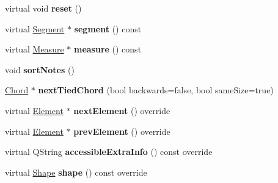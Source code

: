\begin{DoxyCompactItemize}
virtual void {\bfseries reset} ()
\item 
\mbox{\label{class_ms_1_1_chord_a6fc7f6c2b4efc0d38527023089169fac}} 
virtual \hyperlink{class_ms_1_1_segment}{Segment} $\ast$ {\bfseries segment} () const
\item 
\mbox{\label{class_ms_1_1_chord_a0f7ea26684e3b8de00cabbc489d1fa6b}} 
virtual \hyperlink{class_ms_1_1_measure}{Measure} $\ast$ {\bfseries measure} () const
\item 
\mbox{\label{class_ms_1_1_chord_a20163c8fc284ff06c00570f4fd26fb7a}} 
void {\bfseries sort\+Notes} ()
\item 
\mbox{\label{class_ms_1_1_chord_ab446d5ec17c723bb50077547e4789885}} 
\hyperlink{class_ms_1_1_chord}{Chord} $\ast$ {\bfseries next\+Tied\+Chord} (bool backwards=false, bool same\+Size=true)
\item 
\mbox{\label{class_ms_1_1_chord_acd0212299411535e59cdb0a4d1c6a73f}} 
virtual \hyperlink{class_ms_1_1_element}{Element} $\ast$ {\bfseries next\+Element} () override
\item 
\mbox{\label{class_ms_1_1_chord_abd73f16e79d341245a0b408b68b1298b}} 
virtual \hyperlink{class_ms_1_1_element}{Element} $\ast$ {\bfseries prev\+Element} () override
\item 
\mbox{\label{class_ms_1_1_chord_a48aafab3949759f1893250ac7d71d2ae}} 
virtual Q\+String {\bfseries accessible\+Extra\+Info} () const override
\item 
\mbox{\label{class_ms_1_1_chord_a9e6b509fdfe667a0dde3040ec5cea988}} 
virtual \hyperlink{class_ms_1_1_shape}{Shape} {\bfseries shape} () const override
\end{DoxyCompactItemize}
